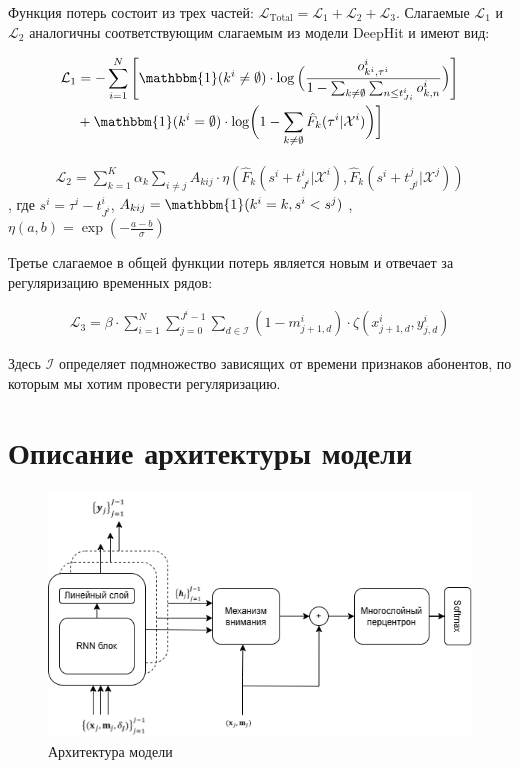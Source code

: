 \documentclass[a4paper,14pt,oneside,openany]{memoir}
\begin{document}
Функция потерь состоит из трех частей: $\mathcal{L}_{\mathrm{Total}}=\mathcal{L}_1+\mathcal{L}_2+\mathcal{L}_3$. Слагаемые $\mathcal{L}_1$ и $\mathcal{L}_2$ аналогичны соответствующим слагаемым из модели DeepHit и имеют вид: 

\begin{equation}
	\begin{aligned}
		\mathcal{L}_{1} & =-\sum_{i=1}^N\left[\mathbbm{1}(k^i\neq\emptyset)\cdot\log\Big(\frac{o_{k^i,\tau^i}^i}{1-\sum_{k\neq\emptyset}\sum_{n\leq t_{Ji}^i}o_{k,n}^i}\Big)\right] \\
		& +\mathbbm{1}(k^i=\emptyset)\cdot\log\biggl(1-\sum_{k\neq\emptyset}\hat{F}_k(\tau^i|\mathcal{X}^i)\biggr)\biggr]
	\end{aligned}
\end{equation}

\begin{equation}
	\begin{aligned}
		\mathcal{L}_2=\sum_{k=1}^K\alpha_k\sum_{i\neq j}A_{kij}\cdot\eta\left(\hat{F}_k(s^i+t_{J^i}^i|\mathcal{X}^i),\hat{F}_k(s^i+t_{J^j}^j|\mathcal{X}^j)\right)
	\end{aligned}
\end{equation}
, где $s^i=\tau^i-t_{J^i}^i$, $A_{kij}=\mathbbm{1}(k^i=k,s^i<s^j)$ , $\eta(a,b)=\exp\left(-\frac{a-b}{\sigma}\right)$


Третье слагаемое в общей функции потерь является новым и отвечает за регуляризацию временных рядов: 

\begin{equation}
	\begin{aligned}
		\mathcal{L}_3=\beta\cdot\sum_{i=1}^N\sum_{j=0}^{J^i-1}\sum_{d\in\mathcal{I}}(1-m_{j+1,d}^i)\cdot\zeta(x_{j+1,d}^i,y_{j,d}^i)	
	\end{aligned}
\end{equation}		

Здесь $\mathcal{I}$ определяет подмножество зависящих от времени признаков абонентов, по которым мы хотим провести регуляризацию. 

\section{Описание архитектуры модели}

\begin{figure}[H]
	\includegraphics[width=1\textwidth]{../figures/dynamic_deephit_scheme_only_architecture.png}
	\caption{Архитектура модели}
\end{figure}
\end{document}
